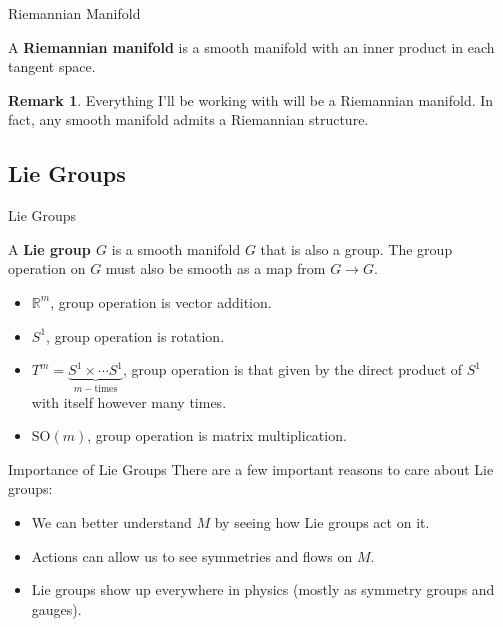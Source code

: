 \documentclass[usenames,dvipsnames]{beamer}
\theoremstyle{definition}
\newtheorem*{remark}{Remark}
\theoremstyle{theorem}
\newcommand{\R}{\mathbb{R}}
\begin{document}
    \begin{frame}{Riemannian Manifold}
        \begin{definition}
            A \textbf{Riemannian manifold} is a smooth manifold with an inner product in each tangent space.
        \end{definition}
        \begin{remark}
            Everything I'll be working with will be a Riemannian manifold. In fact, any smooth manifold admits a Riemannian structure.
        \end{remark}
    \end{frame}

    \subsection{Lie Groups}
    \begin{frame}{Lie Groups}
        \begin{definition}
            A \textbf{Lie group $G$} is a smooth manifold $G$ that is also a group. The group operation on $G$ must also be smooth as a map from $G \to G$.
        \end{definition}
        \begin{example}
        \begin{itemize}
            \item $\R^m$, group operation is vector addition.
            \item $S^1$, group operation is rotation.
            \item $T^m = \underbrace{S^1\times \cdots S^1}_{m-\textrm{times}}$, group operation is that given by the direct product of $S^1$ with itself however many times.
            \item $\textrm{SO}(m)$, group operation is matrix multiplication.
        \end{itemize}
        \end{example}
    \end{frame}
    
    
    \begin{frame}{Importance of Lie Groups}
        There are a few important reasons to care about Lie groups:
        \begin{itemize}
            \item We can better understand $M$ by seeing how Lie groups act on it.
            \item Actions can allow us to see symmetries and flows on $M$.
            \item Lie groups show up everywhere in physics (mostly as symmetry groups and gauges).
        \end{itemize}
    \end{frame}
    
\end{document}
